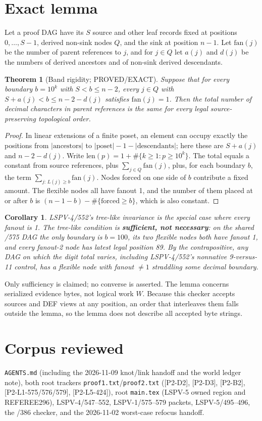\documentclass[11pt]{article}
\newtheorem{theorem}{Theorem}
\newtheorem{corollary}{Corollary}
\begin{document}
\section*{Exact lemma}
Let a proof DAG have its $S$ source and other leaf records fixed at positions $0,\dots,S-1$, derived non-sink
nodes $Q$, and the sink at position $n-1$. Let $\mathrm{fan}(j)$ be the number of parent references to $j$, and for
$j\in Q$ let $a(j)$ and $d(j)$ be the numbers of derived ancestors and of non-sink derived descendants.
\begin{theorem}[Band rigidity; PROVED/EXACT]
Suppose that for every boundary $b=10^k$ with $S<b\le n-2$, every $j\in Q$ with
$S+a(j)<b\le n-2-d(j)$ satisfies $\mathrm{fan}(j)=1$. Then the total number of decimal characters in parent
references is the same for every legal source-preserving topological order.
\end{theorem}
\begin{proof}
In linear extensions of a finite poset, an element can occupy exactly the positions from
$|\text{ancestors}|$ to $|\text{poset}|-1-|\text{descendants}|$; here these are
$S+a(j)$ and $n-2-d(j)$. Write $\mathrm{len}(p)=1+\#\{k\ge1:p\ge10^k\}$. The total equals a constant from
source references, plus $\sum_{j\in Q}\mathrm{fan}(j)$, plus, for each boundary $b$, the term
$\sum_{j:\,L(j)\ge b}\mathrm{fan}(j)$. Nodes forced on one side of $b$ contribute a fixed amount. The flexible nodes all have fanout 1,
and the number of them placed at or after $b$ is $(n-1-b)-\#\{\text{forced}\ge b\}$, which is also constant.
\end{proof}
\begin{corollary}
LSPV-4/552's tree-like invariance is the special case where every fanout is 1. The tree-like condition is
\textbf{sufficient, not necessary}: on the shared /575 DAG the only boundary is $b=100$, its two flexible nodes
both have fanout 1, and every fanout-2 node has latest legal position 89. By the contrapositive, any DAG on which
the digit total varies, including LSPV-4/552's nonnative 9-versus-11 control, has a flexible node with
fanout $\ne1$ straddling some decimal boundary.
\end{corollary}
Only sufficiency is claimed; no converse is asserted. The lemma concerns serialized evidence bytes, not
logical work $W$. Because this checker accepts sources and DEF views at any position, an order that interleaves
them falls outside the lemma, so the lemma does not describe all accepted byte strings.

\section*{Corpus reviewed}
\texttt{AGENTS.md} (including the 2026-11-09 knot/link handoff and the world ledger note), both root trackers
\texttt{proof1.txt}/\texttt{proof2.txt} ([P2-D2], [P2-D3], [P2-B2], [P2-L1-575/576/579], [P2-L5-424]), root \texttt{main.tex}
(LSPV-5 owned region and REFEREE296), LSPV-4/547--552, LSPV-1/575--579 packets, LSPV-5/495--496, the /386
checker, and the 2026-11-02 worst-case refocus handoff.
\end{document}
